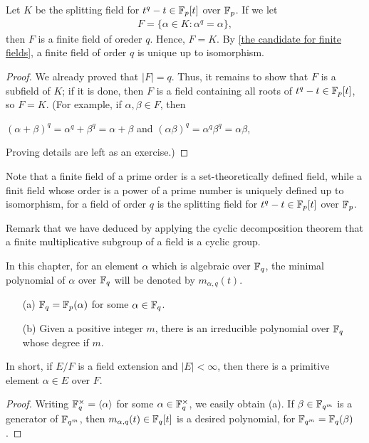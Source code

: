 \begin{thm}
    Let $K$ be the splitting field for $t^q-t\in{\mathbb{F}}_p[t]$ over ${\mathbb{F}}_p$.
    If we let
    \begin{align*}
        F=\{\alpha\in K: \alpha^q=\alpha\},
    \end{align*}
    then $F$ is a finite field of oreder $q$.
    Hence, $F=K$.
    By \cref{the candidate for finite fields}, a finite field of order $q$ is unique up to isomorphism.
\end{thm}
\begin{proof}
    We already proved that $|F|=q$.
    Thus, it remains to show that $F$ is a subfield of $K$; if it is done, then $F$ is a field containing all roots of $t^q-t\in{\mathbb{F}}_p[t]$, so $F=K$.
    (For example, if $\alpha, \beta\in F$, then
    \begin{center}
        $(\alpha+\beta)^q=\alpha^q+\beta^q=\alpha+\beta$ and $(\alpha\beta)^q=\alpha^q\beta^q=\alpha\beta$,
    \end{center}
    \color{brown}Proving details are left as an exercise.\color{black})
\end{proof}
\begin{rmk}
    Note that a finite field of a prime order is a set-theoretically defined field, while a finit field whose order is a power of a prime number is uniquely defined up to isomorphism, for a field of order $q$ is the splitting field for $t^q-t\in{\mathbb{F}}_p[t]$ over ${\mathbb{F}}_p$.
\end{rmk}

Remark that we have deduced by applying the cyclic decomposition theorem that a finite multiplicative subgroup of a field is a cyclic group.
\begin{nota}
    In this chapter, for an element $\alpha$ which is algebraic over ${\mathbb{F}}_q$, the minimal polynomial of $\alpha$ over ${\mathbb{F}}_q$ will be denoted by $m_{\alpha, q}(t)$.
\end{nota}

\begin{prop}
    \begin{enumerate}
        \item[(a)]
        {
            ${\mathbb{F}}_q={\mathbb{F}}_p(\alpha)$ for some $\alpha\in{\mathbb{F}}_q$.
        }
        \item[(b)]
        {
            Given a positive integer $m$, there is an irreducible polynomial over ${\mathbb{F}}_q$ whose degree if $m$.
        }
    \end{enumerate}
    In short, if $E/F$ is a field extension and $|E|<\infty$, then there is a primitive element $\alpha\in E$ over $F$.
\end{prop}
\begin{proof}
    Writing ${\mathbb{F}}_q^\times={\left\langle{\alpha}\right\rangle}$ for some $\alpha\in{\mathbb{F}}_q^\times$, we easily obtain (a).
    If $\beta\in{\mathbb{F}}_{q^m}$ is a generator of ${\mathbb{F}}_{q^m}$, then $m_{\alpha, q}(t)\in{\mathbb{F}}_q[t]$ is a desired polynomial, for ${\mathbb{F}}_{q^m}={\mathbb{F}}_q(\beta)$.
\end{proof}

